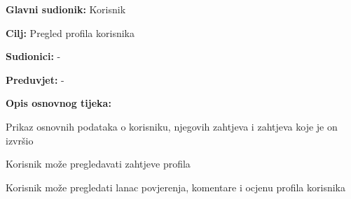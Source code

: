 		
			\noindent {}
			\begin{packed_item}
				
				\item \textbf{Glavni sudionik: }Korisnik
				\item  \textbf{Cilj:} Pregled profila korisnika 
				\item  \textbf{Sudionici:} -
				\item  \textbf{Preduvjet:} -
				\item  \textbf{Opis osnovnog tijeka:}
				
				\item[] \begin{packed_enum}
					
					\item Prikaz osnovnih podataka o korisniku, njegovih zahtjeva i zahtjeva koje je on izvršio
					\item Korisnik može pregledavati zahtjeve profila
					\item Korisnik može pregledati lanac povjerenja, komentare i ocjenu profila korisnika
				\end{packed_enum}
				
			\end{packed_item}
		
